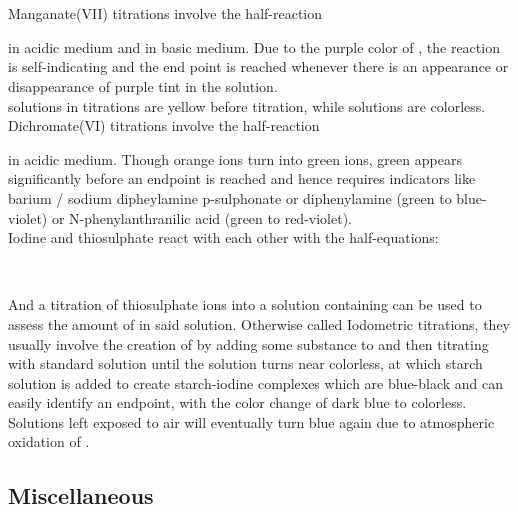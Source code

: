 \documentclass[../main]{subfiles}
\begin{document}
	\begin{center}
		 \\
		 \\
	\end{center}

	Manganate(VII) titrations involve the half-reaction 
	\begin{center} \end{center}
	in acidic medium and  in basic medium. Due to the purple color of , the reaction is self-indicating and the end point is reached whenever there is an appearance or disappearance of purple tint in the solution.\\

	 solutions in  titrations are yellow before titration, while  solutions are colorless. \\

	Dichromate(VI) titrations involve the half-reaction 
	\begin{center}  \end{center}
	in acidic medium. Though orange  ions turn into green  ions, green appears significantly before an endpoint is reached and hence requires indicators like barium / sodium dipheylamine p-sulphonate or diphenylamine (green to blue-violet) or N-phenylanthranilic acid (green to red-violet). \\

	Iodine and thiosulphate react with each other with the half-equations:

	\begin{center}
		 \\
	\end{center} 

	And a titration of thiosulphate ions into a solution containing  can be used to assess the amount of  in said solution. Otherwise called Iodometric titrations, they usually involve the creation of  by adding some substance to  and then titrating with standard  solution until the solution turns near colorless, at which starch solution is added to create starch-iodine complexes which are blue-black and can easily identify an endpoint, with the color change of dark blue to colorless. Solutions left exposed to air will eventually turn blue again due to atmospheric oxidation of .

	\subsection{Miscellaneous}

\end{document}
